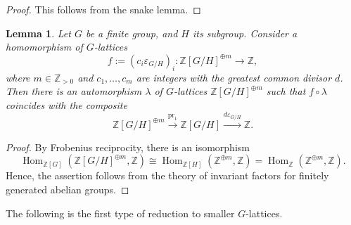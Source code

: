 \documentclass[12pt]{amsart}
\theoremstyle{plain}
\newtheorem{lem}[thm]{Lemma}
\theoremstyle{definition}
\numberwithin{thm}{section}
\numberwithin{equation}{section}
\newcommand{\Zpn}{\mathbb{Z}_{>0}}
\newcommand{\Z}{\mathbb{Z}}
\DeclareMathOperator{\Hom}{Hom}
\DeclareMathOperator{\pr}{pr}
\begin{document}
\begin{proof}
    This follows from the snake lemma. 
\end{proof}

\begin{lem}\label{lem:ivfc}
Let $G$ be a finite group, and $H$ its subgroup. Consider a homomorphism of $G$-lattices
\begin{equation*}
f:=(c_{i}\varepsilon_{G/H})_{i}\colon \Z[G/H]^{\oplus m}\rightarrow \Z,
\end{equation*}
where $m\in \Zpn$ and $c_{1},\ldots,c_{m}$ are integers with the greatest common divisor $d$. Then there is an automorphism $\lambda$ of $G$-lattices $\Z[G/H]^{\oplus m}$ such that $f\circ \lambda$ coincides with the composite
\begin{equation*}
    \Z[G/H]^{\oplus m}\xrightarrow{\pr_{1}}\Z[G/H]\xrightarrow{d\varepsilon_{G/H}}\Z. 
\end{equation*}
\end{lem}

\begin{proof}
By Frobenius reciprocity, there is an isomorphism
   \begin{equation*}
       \Hom_{\Z[G]}(\Z[G/H]^{\oplus m},\Z)\cong \Hom_{\Z[H]}(\Z^{\oplus m},\Z)=\Hom_{\Z}(\Z^{\oplus m},\Z). 
   \end{equation*}
Hence, the assertion follows from the theory of invariant factors for finitely generated abelian groups. 
\end{proof}

The following is the first type of reduction to smaller $G$-lattices. 
\end{document}
